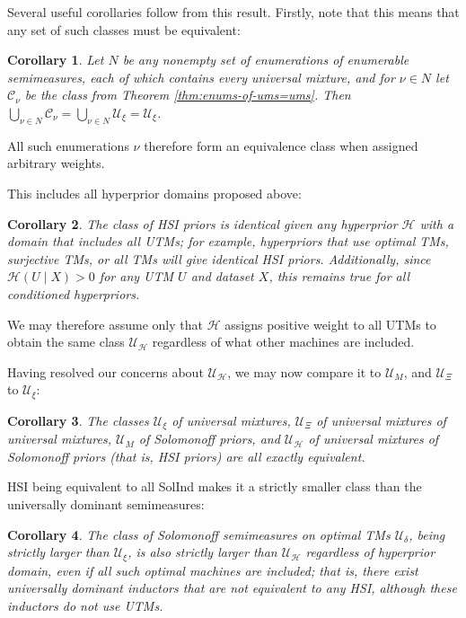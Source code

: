 \documentclass[11pt]{article}
\newcommand{\Eta}{\mathcal{H}}
\newtheorem{corollary}{Corollary}[theorem]
\begin{document}
Several useful corollaries follow from this result.
Firstly, note that this means that any set of such classes must be equivalent:
\begin{corollary}
\label{cor:sets-of-enums=ums}
Let $N$ be any nonempty set of enumerations of enumerable semimeasures, each of which contains every universal mixture, and for $\nu\in N$ let $\mathcal{C}_\nu$ be the class from Theorem \ref{thm:enums-of-ums=ums}.
Then $\bigcup_{\nu\in N}\mathcal{C}_\nu=\bigcup_{\nu\in N}\mathcal{U}_\xi=\mathcal{U}_\xi$.
\end{corollary}
All such enumerations $\nu$ therefore form an equivalence class when assigned arbitrary weights.

This includes all hyperprior domains proposed above:
\begin{corollary}
\label{cor:hsi-domain-equivalence}
The class of HSI priors is identical given any hyperprior $\Eta$ with a domain that includes all UTMs; for example, hyperpriors that use optimal TMs, surjective TMs, or all TMs will give identical HSI priors. Additionally, since $\Eta(U\mid X)>0$ for any UTM $U$ and dataset $X$, this remains true for all conditioned hyperpriors.
\end{corollary}
We may therefore assume only that $\Eta$ assigns positive weight to all UTMs to obtain the same class $\mathcal{U}_\Eta$ regardless of what other machines are included.

Having resolved our concerns about $\mathcal{U}_\Eta$, we may now compare it to $\mathcal{U}_M$, and $\mathcal{U}_\Xi$ to $\mathcal{U}_\xi$:
\begin{corollary}
\label{cor:um=umum=solind=hsi}
The classes $\mathcal{U}_\xi$ of universal mixtures, $\mathcal{U}_\Xi$ of universal mixtures of universal mixtures, $\mathcal{U}_M$ of Solomonoff priors, and $\mathcal{U}_\Eta$ of universal mixtures of Solomonoff priors (that is, HSI priors) are all exactly equivalent.
\end{corollary}

HSI being equivalent to all SolInd makes it a strictly smaller class than the universally dominant semimeasures:
\begin{corollary}
\label{cor:optimal-solind>hsi}
The class of Solomonoff semimeasures on optimal TMs $\mathcal{U}_\delta$, being strictly larger than $\mathcal{U}_\xi$, is also strictly larger than $\mathcal{U}_\Eta$ regardless of hyperprior domain, even if all such optimal machines are included; that is, there exist universally dominant inductors that are not equivalent to any HSI, although these inductors do not use UTMs.
\end{corollary}
\end{document}
